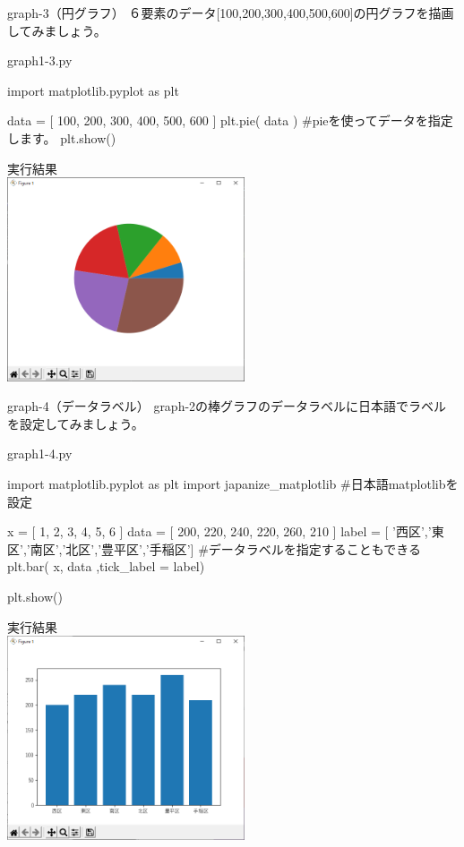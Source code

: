 \newpage
\begin{pabox}{graph-3（円グラフ）}
６要素のデータ[100,200,300,400,500,600]の円グラフを描画してみましょう。
\begin{legbox}{graph1-3.py}
\begin{listing}{1}
import matplotlib.pyplot as plt

data = [ 100, 200, 300, 400, 500, 600 ]
plt.pie( data )
#pieを使ってデータを指定します。
plt.show()
\end{listing}


実行結果\\

\includegraphics[width=7cm]{images/graph3.png} 

\end{legbox}
\end{pabox}
\newpage
\begin{pabox}{graph-4（データラベル）}
graph-2の棒グラフのデータラベルに日本語でラベルを設定してみましょう。
\begin{legbox}{graph1-4.py}
\begin{listing}{1}
import matplotlib.pyplot as plt
import japanize_matplotlib
#日本語matplotlibを設定

x = [ 1, 2, 3, 4, 5, 6 ]
data = [ 200, 220, 240, 220, 260, 210 ]
label = [ '西区','東区','南区','北区','豊平区','手稲区']
#データラベルを指定することもできる
plt.bar( x, data ,tick_label = label)

plt.show()
\end{listing}


実行結果\\

\includegraphics[width=7cm]{images/graph4.png} 

\end{legbox}
\end{pabox}


